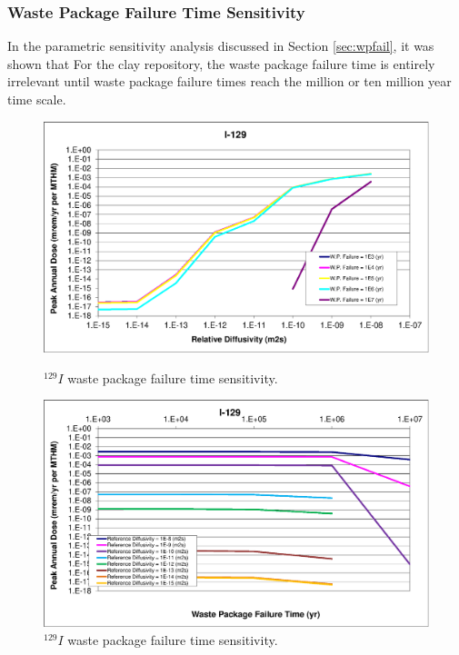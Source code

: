 \subsubsection{Waste Package Failure Time Sensitivity}

In the parametric sensitivity analysis discussed in Section 
\ref{sec:wpfail}, it was shown that For the clay repository, the waste 
package failure time is entirely irrelevant until waste package failure times 
reach the million or ten million year time scale. 

\begin{figure}[ht!]
  \centering
  \begin{minipage}[b]{0.45\linewidth}
    \includegraphics[width=\linewidth]{./chapters/nuclide_sensitivity/clay/WPFailExtended/I-129.eps}
    \caption{$^{129}I$ waste package failure time sensitivity. }
    \label{fig:WPFailI129}

  \end{minipage}
  \hspace{0.05\linewidth}
  \begin{minipage}[b]{0.45\linewidth}

    \includegraphics[width=\linewidth]{./chapters/nuclide_sensitivity/clay/WPFailExtended/I-129-WPFail.eps}
    \caption{$^{129}I$ waste package failure time sensitivity. }
    \label{fig:WPFailI129}

  \end{minipage}
\end{figure}
